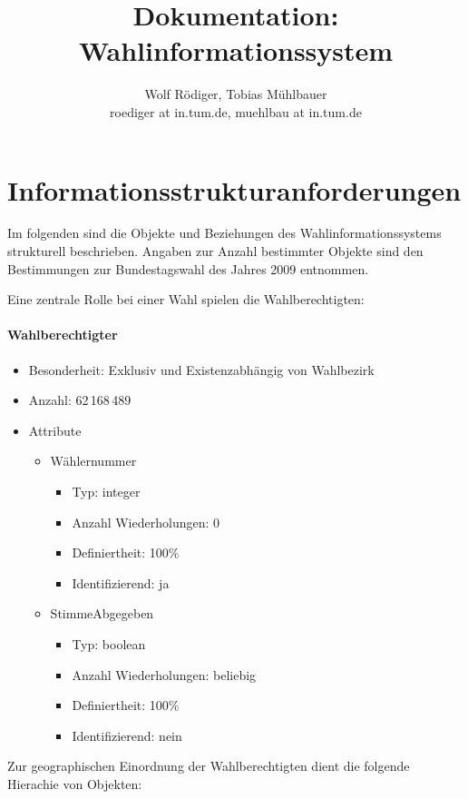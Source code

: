 \documentclass[a4paper]{article}
\author{Wolf Rödiger, Tobias Mühlbauer \\ roediger at in.tum.de, muehlbau at in.tum.de}
\title{Dokumentation: Wahlinformationssystem}
\begin{document}
\maketitle

\newpage

\tableofcontents

\newpage

\section{Informationsstrukturanforderungen}

Im folgenden sind die Objekte und Beziehungen des Wahlinformationssystems strukturell beschrieben. Angaben zur Anzahl bestimmter Objekte sind den Bestimmungen zur Bundestagswahl des Jahres 2009 entnommen.

Eine zentrale Rolle bei einer Wahl spielen die Wahlberechtigten:

\paragraph{Wahlberechtigter}
\begin{itemize}
\item Besonderheit: Exklusiv und Existenzabhängig von Wahlbezirk
\item Anzahl: 62\,168\,489
\item Attribute
	\begin{itemize}
	\item Wählernummer
		\begin{itemize}
		\item Typ: integer
		\item Anzahl Wiederholungen: 0
		\item Definiertheit: 100\%
		\item Identifizierend: ja
		\end{itemize}
	\item StimmeAbgegeben
		\begin{itemize}
		\item Typ: boolean
		\item Anzahl Wiederholungen: beliebig
		\item Definiertheit: 100\%
		\item Identifizierend: nein
		\end{itemize}
	\end{itemize}
\end{itemize}

Zur geographischen Einordnung der Wahlberechtigten dient die folgende Hierachie von Objekten:
\end{document}
